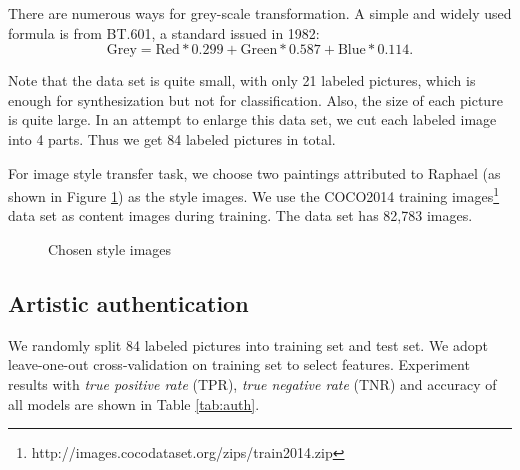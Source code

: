 \documentclass{article}
\begin{document}
There are numerous ways for grey-scale transformation. A simple and widely used formula is from BT.601, a standard issued in 1982:
\begin{equation}
\text{Grey} = \text{Red} * 0.299 + \text{Green} * 0.587 + \text{Blue} * 0.114.
\end{equation}

Note that the data set is quite small, with only 21 labeled pictures,
which is enough for synthesization but not for classification. 
Also, the size of each picture is quite large.
In an attempt to enlarge this data set, we cut each labeled image into 4 parts. 
Thus we get 84 labeled pictures in total.

For image style transfer task, we choose two paintings attributed to Raphael (as shown in Figure \ref{fig:style-images}) as the style images. We use the COCO2014 training images\footnote{http://images.cocodataset.org/zips/train2014.zip} data set as content images during training. The data set has 82,783 images.

\begin{figure}[htb]
\centering
{}
\quad
{}
\caption{Chosen style images}
\label{fig:style-images}
\end{figure}

\subsection{Artistic authentication}
\label{experiments}

We randomly split 84 labeled pictures into training set and test set. We adopt leave-one-out cross-validation on training set to select features. Experiment results with \textit{true positive rate} (TPR), \textit{true negative rate} (TNR) and accuracy of all models are shown in Table \ref{tab:auth}.
\end{document}

